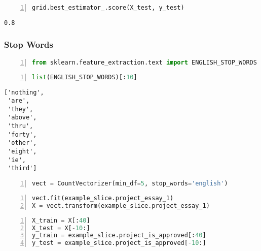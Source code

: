 \documentclass[10pt,parskip=half,
	toc=sectionentrywithdots,
	bibliography=totocnumbered,
	captions=tableheading,numbers=noendperiod]{scrartcl}
\begin{document}
\begin{lstlisting}[language=Python,numbers=left,xleftmargin=20pt,xrightmargin=5pt,belowskip=5pt,aboveskip=5pt]
grid.best_estimator_.score(X_test, y_test)
\end{lstlisting}

\begin{lstlisting}[language={},postbreak={},numbers=none,xrightmargin=7pt,breakindent=0pt,aboveskip=5pt,belowskip=5pt]
0.8
\end{lstlisting}

\subsubsection{Stop Words}\label{stop-words}

\begin{lstlisting}[language=Python,numbers=left,xleftmargin=20pt,xrightmargin=5pt,belowskip=5pt,aboveskip=5pt]
from sklearn.feature_extraction.text import ENGLISH_STOP_WORDS
\end{lstlisting}

\begin{lstlisting}[language=Python,numbers=left,xleftmargin=20pt,xrightmargin=5pt,belowskip=5pt,aboveskip=5pt]
list(ENGLISH_STOP_WORDS)[:10]
\end{lstlisting}

\begin{lstlisting}[language={},postbreak={},numbers=none,xrightmargin=7pt,breakindent=0pt,aboveskip=5pt,belowskip=5pt]
['nothing',
 'are',
 'they',
 'above',
 'thru',
 'forty',
 'other',
 'eight',
 'ie',
 'third']
\end{lstlisting}

\begin{lstlisting}[language=Python,numbers=left,xleftmargin=20pt,xrightmargin=5pt,belowskip=5pt,aboveskip=5pt]
vect = CountVectorizer(min_df=5, stop_words='english')
\end{lstlisting}

\begin{lstlisting}[language=Python,numbers=left,xleftmargin=20pt,xrightmargin=5pt,belowskip=5pt,aboveskip=5pt]
vect.fit(example_slice.project_essay_1)
X = vect.transform(example_slice.project_essay_1)
\end{lstlisting}

\begin{lstlisting}[language=Python,numbers=left,xleftmargin=20pt,xrightmargin=5pt,belowskip=5pt,aboveskip=5pt]
X_train = X[:40]
X_test = X[-10:]
y_train = example_slice.project_is_approved[:40]
y_test = example_slice.project_is_approved[-10:]
\end{lstlisting}
\end{document}
